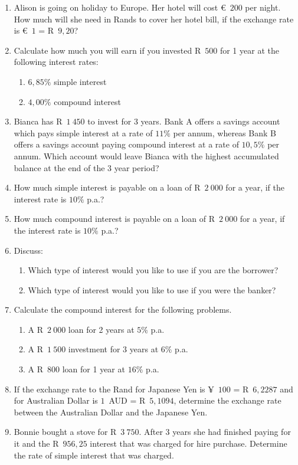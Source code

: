 \begin{eocexercises}{}
    \begin{enumerate}[label=\textbf{\arabic*}.]
	\item Alison is going on holiday to Europe. Her hotel will cost €~$200$ per night. How much will she need in Rands to cover her hotel bill, if the exchange rate is €~$1$ = R~$9,20$?
	\item Calculate how much you will earn if you invested R~$500$ for 1 year at the following interest rates:
	\begin{enumerate}[noitemsep, label=\textbf{(\alph*)} ]
	    \item $6,85\%$ simple interest
	    \item $4,00\%$ compound interest
	\end{enumerate}
	\item Bianca has R~$1~450$ to invest for 3 years. Bank A offers a savings account which pays simple interest at a rate of $11\%$ per annum, whereas Bank B offers a savings account paying compound interest at a rate of $10,5\%$ per annum. Which account would leave Bianca with the highest accumulated balance at the end of the 3 year period?
	\item How much simple interest is payable on a loan of R~$2~000$ for a year, if the interest rate is $10\%$ p.a.?
	\item How much compound interest is payable on a loan of R~$2~000$ for a year, if the interest rate is $10\%$ p.a.?
	\item Discuss:
	\begin{enumerate}[noitemsep, label=\textbf{(\alph*)} ]
	    \item Which type of interest would you like to use if you are the borrower?
	    \item Which type of interest would you like to use if you were the banker?
	\end{enumerate}
	\item Calculate the compound interest for the following problems.
	\begin{enumerate}[noitemsep, label=\textbf{(\alph*)} ]
	    \item A R~$2~000$ loan for 2 years at $5\%$ p.a.
	    \item A R~$1~500$ investment for 3 years at $6\%$ p.a.
	    \item A R~$800$ loan for 1 year at $16\%$ p.a.
	\end{enumerate}
	\item If the exchange rate to the Rand for Japanese Yen is
          ¥~$100$ = R~$6,2287$ and for Australian Dollar is $1$~AUD =
          R~$5,1094$, determine the exchange rate between the
          Australian Dollar and the Japanese Yen.
	\item Bonnie bought a stove for R~$3~750$. After $3$ years she had finished paying for it and the R~$956,25$ interest that was charged for hire purchase. Determine the rate of simple interest that was charged.
    \end{enumerate}
\end{eocexercises}


